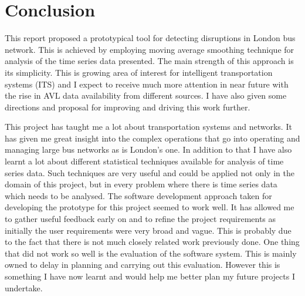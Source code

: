 \section{Conclusion}
This report proposed a prototypical tool for detecting disruptions in London bus network. This is achieved by employing moving average smoothing technique for analysis of the time series data presented. The main strength of this approach is its simplicity. This is growing area of interest for intelligent transportation systems (ITS) and I expect to receive much more attention in near future with the rise in AVL data availability from different sources. I have also given some directions and proposal for improving and driving this work further.

This project has taught me a lot about transportation systems and networks. It has given me great insight into the complex operations that go into operating and managing large bus networks as is London's one. In addition to that I have also learnt a lot about different statistical techniques available for analysis of time series data. Such techniques are very useful and could be applied not only in the domain of this project, but in every problem where there is time series data which needs to be analysed. The software development approach taken for developing the prototype for this project seemed to work well. It has allowed me to gather useful feedback early on and to refine the project requirements as initially the user requirements were very broad and vague. This is probably due to the fact that there is not much closely related work previously done. One thing that did not work so well is the evaluation of the software system. This is mainly owned to delay in planning and carrying out this evaluation. However this is something I have now learnt and would help me better plan my future projects I undertake.


